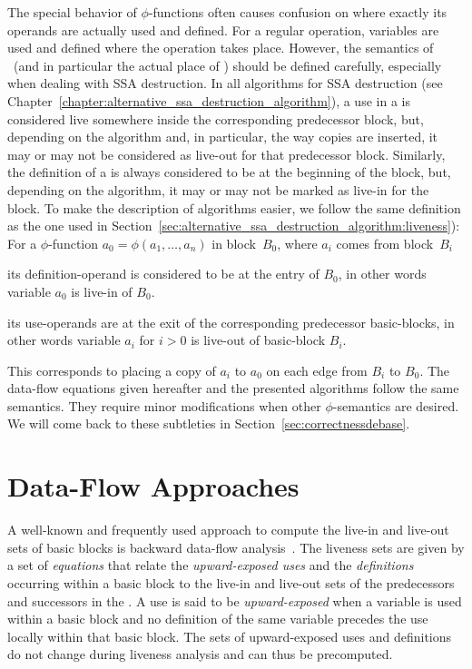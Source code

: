 The special behavior of $\phi$-functions often causes confusion on where exactly its operands are actually used and defined.
For a regular operation, variables are used and defined where the operation takes place.
However, the semantics of \phifuns\ (and in particular the actual place of \phiuses) should be defined carefully, especially when dealing with SSA destruction.
In all algorithms for SSA destruction (see Chapter~\ref{chapter:alternative_ssa_destruction_algorithm}), a use in a \phifun is considered live somewhere inside the corresponding predecessor block, but, depending on the algorithm and, in particular, the way copies are inserted, it may or may not be considered as live-out for that predecessor block.
Similarly, the definition of a \phifun is always considered to be at the beginning of the block, but, depending on the algorithm, it may or may not be marked as live-in for the block.
To make the description of algorithms easier, we follow the same definition as the one used in Section~\ref{sec:alternative_ssa_destruction_algorithm:liveness}):
For a $\phi$-function $a_0 = \phi(a_1, \ldots, a_n)$ in block~$B_0$, where $a_i$ comes from block~$B_i$
\begin{compactitem}
\item
	its definition-operand is considered to be at the entry of $B_0$, in other words variable $a_0$ is live-in of $B_0$.
\item
	its use-operands are at the exit of the corresponding predecessor basic-blocks, in other words variable $a_i$ for $i>0$ is live-out of basic-block $B_i$.
\end{compactitem}
This corresponds to placing a copy of $a_i$ to $a_0$ on each edge from $B_i$ to $B_0$.
The data-flow equations given hereafter and the presented algorithms follow the same semantics.
They require minor modifications when other $\phi$-semantics are desired.
We will come back to these subtleties in Section~\ref{sec:correctnessdebase}.

\section{Data-Flow Approaches}
\label{sec:data-flow}

A well-known and frequently used approach to compute the live-in and live-out sets of basic blocks is backward data-flow analysis~\cite{appel:2002:modern}.
The liveness sets are given by a set of \emph{equations} that relate the \emph{upward-exposed uses} and the \emph{definitions} occurring within a basic block to the live-in and live-out sets of the predecessors and successors in the \@CFG.
A use is said to be \emph{upward-exposed} when a variable is used within a basic block and no definition of the same variable precedes the use locally within that basic block.
The sets of upward-exposed uses and definitions do not change during liveness analysis and can thus be precomputed.

